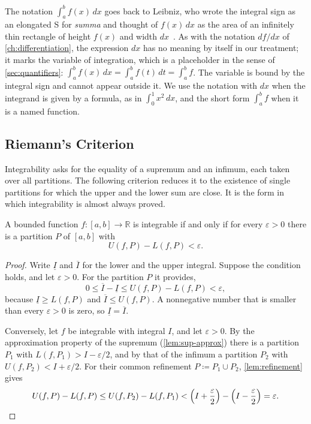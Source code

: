 The notation $\int_a^bf(x)\,dx$ goes back to Leibniz, who wrote the integral sign as an elongated S for \emph{summa} and thought of $f(x)\,dx$ as the area of an infinitely thin rectangle of height $f(x)$ and width $dx$~\cite{edwards1979}. As with the notation $df/dx$ of \cref{ch:differentiation}, the expression $dx$ has no meaning by itself in our treatment; it marks the variable of integration, which is a placeholder in the sense of \cref{sec:quantifiers}: $\int_a^bf(x)\,dx=\int_a^bf(t)\,dt=\int_a^bf$. The variable is bound by the integral sign and cannot appear outside it. We use the notation with $dx$ when the integrand is given by a formula, as in $\int_0^1x^2\,dx$, and the short form $\int_a^bf$ when it is a named function.

\subsection{Riemann's Criterion}

Integrability asks for the equality of a supremum and an infimum, each taken over all partitions. The following criterion reduces it to the existence of single partitions for which the upper and the lower sum are close. It is the form in which integrability is almost always proved.

\begin{theorem}
\label{thm:riemann-criterion}
A bounded function $f\colon[a,b]\to\mathbb R$ is integrable if and only if for every $\varepsilon>0$ there is a partition $P$ of $[a,b]$ with
\[
U(f,P)-L(f,P)<\varepsilon .
\]
\end{theorem}

\begin{proof}
Write $\underline I$ and $\overline I$ for the lower and the upper integral. Suppose the condition holds, and let $\varepsilon>0$. For the partition $P$ it provides,
\[
0\le\overline I-\underline I\le U(f,P)-L(f,P)<\varepsilon ,
\]
because $\underline I\ge L(f,P)$ and $\overline I\le U(f,P)$. A nonnegative number that is smaller than every $\varepsilon>0$ is zero, so $\underline I=\overline I$.

Conversely, let $f$ be integrable with integral $I$, and let $\varepsilon>0$. By the approximation property of the supremum (\cref{lem:sup-approx}) there is a partition $P_1$ with $L(f,P_1)>I-\varepsilon/2$, and by that of the infimum a partition $P_2$ with $U(f,P_2)<I+\varepsilon/2$. For their common refinement $P\coloneqq P_1\cup P_2$, \cref{lem:refinement} gives
\[
U(f,P)-L(f,P)\le U(f,P_2)-L(f,P_1)<\Bigl(I+\frac\varepsilon2\Bigr)-\Bigl(I-\frac\varepsilon2\Bigr)=\varepsilon .
\]
\end{proof}

